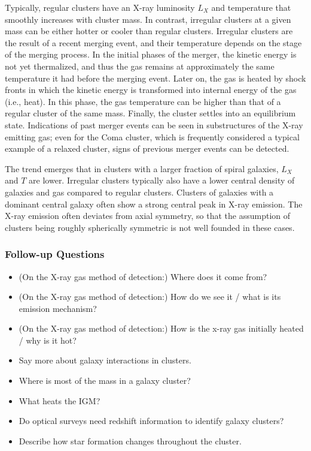 \documentclass[a4paper,11pt]{article}
\begin{document}
{\noindent}Typically, regular clusters have an X-ray luminosity $L_X$ and temperature that smoothly increases with cluster mass. In contrast, irregular clusters at a given mass can be either hotter or cooler than regular clusters. Irregular clusters are the result of a recent merging event, and their temperature depends on the stage of the merging process. In the initial phases of the merger, the kinetic energy is not yet thermalized, and thus the gas remains at approximately the same temperature it had before the merging event. Later on, the gas is heated by shock fronts in which the kinetic energy is transformed into internal energy of the gas (i.e., heat). In this phase, the gas temperature can be higher than that of a regular cluster of the same mass. Finally, the cluster settles into an equilibrium state. Indications of past merger events can be seen in substructures of the X-ray emitting gas; even for the Coma cluster, which is frequently considered a typical example of a relaxed cluster, signs of previous merger events can be detected.

{\noindent}The trend emerges that in clusters with a larger fraction of spiral galaxies, $L_X$ and $T$ are lower. Irregular clusters typically also have a lower central density of galaxies and gas compared to regular clusters. Clusters of galaxies with a dominant central galaxy often show a strong central peak in X-ray emission. The X-ray emission often deviates from axial symmetry, so that the assumption of clusters being roughly spherically symmetric is not well founded in these cases.

\subsubsection{Follow-up Questions}

\begin{itemize}
    \item (On the X-ray gas method of detection:) Where does it come from?
    \item (On the X-ray gas method of detection:) How do we see it / what is its emission mechanism?
    \item (On the X-ray gas method of detection:) How is the x-ray gas initially heated / why is it hot?
    \item Say more about galaxy interactions in clusters.
    \item Where is most of the mass in a galaxy cluster?
    \item What heats the IGM?
    \item Do optical surveys need redshift information to identify galaxy clusters?
    \item Describe how star formation changes throughout the cluster.
    \end{itemize}
\end{document}
